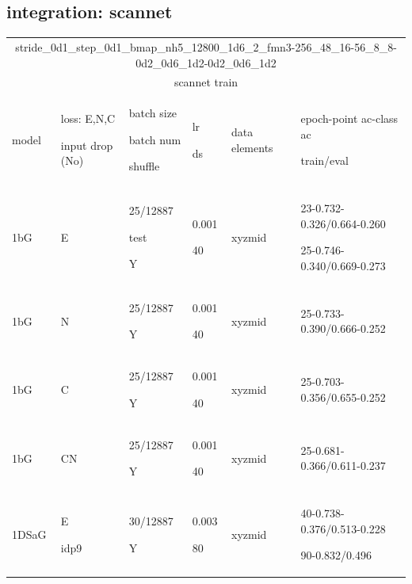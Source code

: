 \documentclass{article}
\begin{document}
\subsection{integration: scannet}
\begin{center}
	\centering {} \small
	\begin{tabular}{|p{1cm} |p{1cm} |p{1.5cm} | p{2cm} | p{2cm} || p{5cm}|} 
		\hline
		\multicolumn{6}{|c|}{stride\_0d1\_step\_0d1\_bmap\_nh5\_12800\_1d6\_2\_fmn3-256\_48\_16-56\_8\_8-0d2\_0d6\_1d2-0d2\_0d6\_1d2 }\\
		\multicolumn{6}{|c|}{ scannet train }\\
		\hline
		model & loss: E,N,C \par input drop (No) & batch size\par batch num \par shuffle& lr\par ds & data elements & epoch-point ac-class ac \par train/eval \\
		\hline
		1bG & E & 25/12887\par test \par Y & 0.001\par 40 & xyzmid & 23-0.732-0.326/0.664-0.260 \par 25-0.746-0.340/0.669-0.273\\ \hline
		1bG & N & 25/12887\par Y & 0.001\par 40 & xyzmid & 25-0.733-0.390/0.666-0.252\\ \hline
		1bG & C & 25/12887\par Y & 0.001\par 40 & xyzmid & 25-0.703-0.356/0.655-0.252\\ \hline
		1bG & CN & 25/12887\par Y & 0.001\par 40 & xyzmid & 25-0.681-0.366/0.611-0.237\\ \hline
		1DSaG & E \par idp9& 30/12887\par Y & 0.003\par 80 & xyzmid & 40-0.738-0.376/0.513-0.228 \par 90-0.832/0.496\\ \hline
		

\end{tabular}
\end{center}
\end{document}
